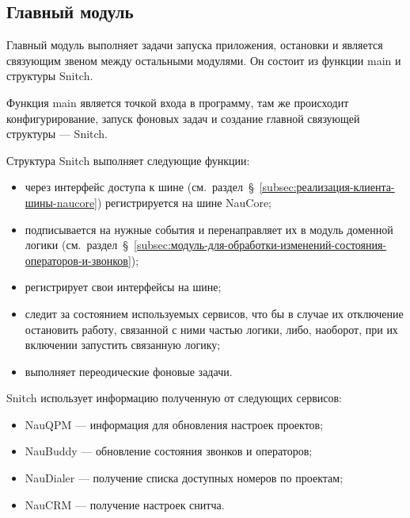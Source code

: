 \subsection{Главный модуль}

Главный модуль выполняет задачи запуска приложения, остановки и является связующим звеном между остальными модулями.
Он состоит из функции main и структуры Snitch.

Функция main является точкой входа в программу, там же происходит конфигурирование, запуск фоновых задач
и создание главной связующей структуры --- Snitch.

Структура Snitch выполняет следующие функции:
\begin{itemize}
    \item через интерфейс доступа к шине (см.~раздел~\S~\ref{subsec:реализация-клиента-шины-naucore})
    регистрируется на шине NauCore;
    \item подписывается на нужные события
    и перенаправляет их в модуль доменной логики (см.~раздел~\S~\ref{subsec:модуль-для-обработки-изменений-состояния-операторов-и-звонков});
    \item регистрирует свои интерфейсы на шине;
    \item следит за состоянием используемых сервисов, что бы в случае их отключение остановить работу, связанной с ними частью логики,
    либо, наоборот, при их включении запустить связанную логику;
    \item выполняет переодические фоновые задачи.
\end{itemize}

Snitch использует информацию полученную от следующих сервисов:
\begin{itemize}
    \item NauQPM --- информация для обновления настроек проектов;
    \item NauBuddy --- обновление состояния звонков и операторов;
    \item NauDialer --- получение списка доступных номеров по проектам;
    \item NauCRM --- получение настроек снитча.
\end{itemize}

